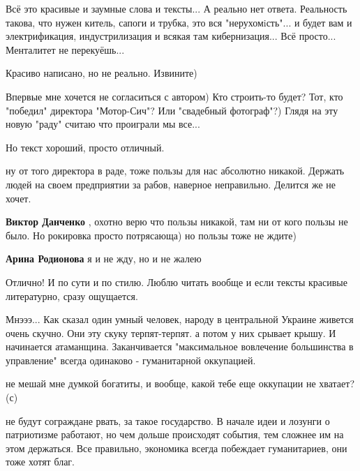 \begin{itemize}

Всё это красивые и заумные слова и тексты... А реально нет ответа. Реальность
такова, что нужен китель, сапоги и трубка, это вся "нерухомiсть"... и будет вам
и электрификация, индустрилизация и всякая там кибернизация... Всё просто...
Менталитет не перекуёшь...


Красиво написано, но не реально. Извините)


Впервые мне хочется не согласиться с автором) Кто строить-то будет? Тот, кто
"победил" директора "Мотор-Сич"? Или "свадебный фотограф"?) Глядя на эту новую
"раду" считаю что проиграли мы все...

Но текст хороший, просто отличный.

\begin{itemize} %

ну от того директора в раде, тоже пользы для нас абсолютно никакой. Держать
людей на своем предприятии за рабов, наверное неправильно. Делится же не хочет.


\textbf{Виктор Данченко} , охотно верю что пользы никакой, там ни от кого пользы не было. Но рокировка просто потрясающа) но пользы тоже не ждите)

\textbf{Арина Родионова} я и не жду, но и не жалею
\end{itemize} %

Отлично! И по сути и по стилю. Люблю читать вообще и если тексты красивые литературно, сразу ощущается.


Мнэээ... Как сказал один умный человек, народу в центральной Украине живется
очень скучно. Они эту скуку терпят-терпят. а потом у них срывает крышу. И
начинается атаманщина. Заканчивается "максимальное вовлечение большинства в
управление" всегда одинаково - гуманитарной оккупацией.

\begin{itemize} %
не мешай мне думкой богатиты, и вообще, какой тебе еще оккупации не хватает?(с)
\end{itemize} %


не будут сограждане рвать, за такое государство. В начале идеи и лозунги о
патриотизме работают, но чем дольше происходят события, тем сложнее им на этом
держаться. Все правильно, экономика всегда побеждает гуманитариев, они тоже
хотят благ.



\end{itemize}
